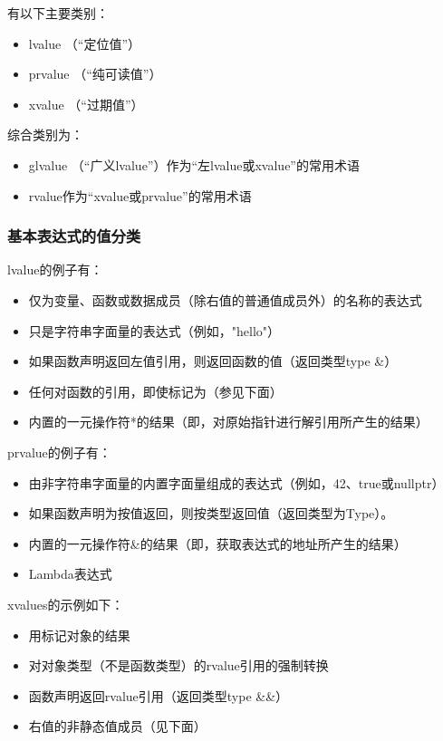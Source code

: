 有以下主要类别：

\begin{itemize}
	\item lvalue （“定位值”）
	\item prvalue （“纯可读值”）
	\item xvalue （“过期值”）
\end{itemize}

综合类别为：

\begin{itemize}
	\item glvalue （“广义lvalue”）作为“左lvalue或xvalue”的常用术语
	\item rvalue作为“xvalue或prvalue”的常用术语
\end{itemize}

\subsubsection{基本表达式的值分类}

lvalue的例子有：

\begin{itemize}
	\item 仅为变量、函数或数据成员（除右值的普通值成员外）的名称的表达式
	\item 只是字符串字面量的表达式（例如，"hello"）
	\item 如果函数声明返回左值引用，则返回函数的值（返回类型type \&）
	\item 任何对函数的引用，即使标记为（参见下面）
	\item 内置的一元操作符*的结果（即，对原始指针进行解引用所产生的结果）
\end{itemize}

prvalue的例子有：

\begin{itemize}
	\item 由非字符串字面量的内置字面量组成的表达式（例如，42、true或nullptr）
	\item 如果函数声明为按值返回，则按类型返回值（返回类型为Type）。
	\item 内置的一元操作符\&的结果（即，获取表达式的地址所产生的结果）
	\item Lambda表达式
\end{itemize}

xvalues的示例如下：

\begin{itemize}
	\item 用标记对象的结果
	\item 对对象类型（不是函数类型）的rvalue引用的强制转换
	\item 函数声明返回rvalue引用（返回类型type \&\&）
	\item 右值的非静态值成员（见下面）
\end{itemize}

